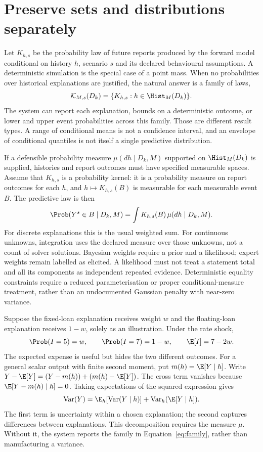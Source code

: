 \section{Preserve sets and distributions separately}

Let $K_{h,s}$ be the probability law of future reports produced by the forward
model conditional on history $h$, scenario $s$ and its declared behavioural
assumptions. A deterministic simulation is the special case of a point mass.
When no probabilities over historical explanations are justified, the natural
answer is a family of laws,
\begin{equation}\label{eq:family}
 \mathcal{K}_{M,s}(D_k)=\{K_{h,s}:h\in\Hist_M(D_k)\}.
\end{equation}
The system can report each explanation, bounds on a deterministic outcome,
or lower and upper event probabilities across this family. Those are different
result types. A range of conditional means is not a confidence interval, and
an envelope of conditional quantiles is not itself a single predictive
distribution.

If a defensible probability measure $\mu(dh\mid D_k,M)$ supported on
$\Hist_M(D_k)$ is supplied, histories and report outcomes must have specified
measurable spaces. Assume that $K_{h,s}$ is a probability kernel: it is a
probability measure on report outcomes for each $h$, and $h\mapsto K_{h,s}(B)$
is measurable for each measurable event $B$. The predictive law is then
\begin{equation}\label{eq:mixture}
 \Prob(Y^s\in B\mid D_k,M)=
 \int K_{h,s}(B)\,\mu(dh\mid D_k,M).
\end{equation}
For discrete explanations this is the usual weighted sum. For continuous
unknowns, integration uses the declared measure over those unknowns, not a
count of solver solutions. Bayesian weights require a prior and a likelihood;
expert weights remain labelled as elicited. A likelihood must not treat a
statement total and all its components as independent repeated evidence.
Deterministic equality constraints require a reduced parameterisation or
proper conditional-measure treatment, rather than an undocumented Gaussian
penalty with near-zero variance.

Suppose the fixed-loan explanation receives weight $w$ and the floating-loan
explanation receives $1-w$, solely as an illustration. Under the rate shock,
\[
 \Prob(I=5)=w,\qquad\Prob(I=7)=1-w,
 \qquad\E[I]=7-2w.
\]
The expected expense is useful but hides the two different outcomes. For a
general scalar output with finite second moment, put $m(h)=\E[Y\mid h]$.
Write $Y-\E[Y]=(Y-m(h))+(m(h)-\E[Y])$. The cross term vanishes because
$\E[Y-m(h)\mid h]=0$. Taking expectations of the squared expression gives
\begin{equation}\label{eq:variance}
 \operatorname{Var}(Y)=
 \E_h[\operatorname{Var}(Y\mid h)]+
 \operatorname{Var}_h(\E[Y\mid h]).
\end{equation}
The first term is uncertainty within a chosen explanation; the second captures
differences between explanations. This decomposition requires the measure
$\mu$. Without it, the system reports the family in
Equation~\eqref{eq:family}, rather than manufacturing a variance.

